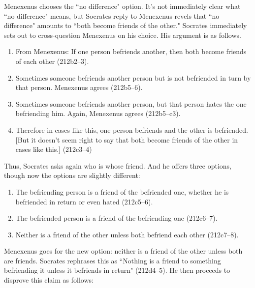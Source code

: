 \documentclass[11pt]{article}
\begin{document}
Menexenus chooses the ``no difference" option.  It's not immediately clear
what ``no difference" means, but Socrates reply to Menexenus revels that
``no difference" amounts to ``both become friends of the other."  Socrates
immediately sets out to cross-question Menexenus on his choice.  His
argument is as follows.

\begin{enumerate}

    \item From Menexenus: If one person befriends another, then both become
        friends of each other (212b2--3).

    \item Sometimes someone befriends another person but is not befriended
        in turn by that person.  Menexenus agrees (212b5--6).

    \item Sometimes someone befriends another person, but that person hates
        the one befriending him.  Again, Menexenus agrees (212b5--c3).

    \item Therefore in cases like this, one person befriends and the other
        is befriended. [But it doesn't seem right to say that both become
        friends of the other in cases like this.] (212c3--4)

\end{enumerate}

Thus, Socrates asks again who is whose friend. And he offers three options,
though now the options are slightly different:

\begin{enumerate}

    \item The befriending person is a friend of the befriended one, whether
        he is befriended in return or even hated (212c5--6).

    \item The befriended person is a friend of the befriending one
        (212c6--7).

    \item Neither is a friend of the other unless both befriend each other
        (212c7--8).

\end{enumerate}

Menexenus goes for the new option: neither is a friend of the other unless
both are friends.  Socrates rephrases this as ``Nothing is a friend to
something befriending it unless it befriends in return" (212d4--5).  He
then proceeds to disprove this claim as follows:
\end{document}
